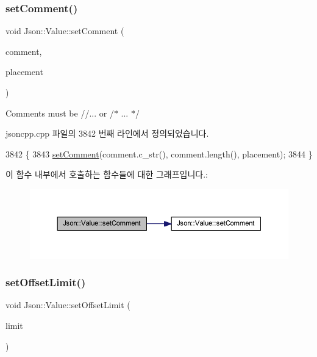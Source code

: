 \subsubsection{\texorpdfstring{set\+Comment()}{setComment()}\hspace{0.1cm}{\footnotesize\ttfamily [3/3]}}
{\footnotesize\ttfamily void Json\+::\+Value\+::set\+Comment (\begin{DoxyParamCaption}\item[{const \hyperlink{json_8h_a1e723f95759de062585bc4a8fd3fa4be}{J\+S\+O\+N\+C\+P\+P\+\_\+\+S\+T\+R\+I\+NG} \&}]{comment,  }\item[{\hyperlink{namespace_json_a4fc417c23905b2ae9e2c47d197a45351}{Comment\+Placement}}]{placement }\end{DoxyParamCaption})}



Comments must be //... or /$\ast$ ... $\ast$/ 



jsoncpp.\+cpp 파일의 3842 번째 라인에서 정의되었습니다.


\begin{DoxyCode}
3842                                                                                 \{
3843   \hyperlink{class_json_1_1_value_a29f3a30f7e5d3af6f38d57999bf5b480}{setComment}(comment.c\_str(), comment.length(), placement);
3844 \}
\end{DoxyCode}
이 함수 내부에서 호출하는 함수들에 대한 그래프입니다.\+:\nopagebreak
\begin{figure}[H]
\begin{center}
\leavevmode
\includegraphics[width=350pt]{class_json_1_1_value_a2c5d13a5f45eb77e912008778e65b27f_cgraph}
\end{center}
\end{figure}
\mbox{\label{class_json_1_1_value_a5e4f5853fec138150c5df6004a8c2bcf}} 
\subsubsection{\texorpdfstring{set\+Offset\+Limit()}{setOffsetLimit()}}
{\footnotesize\ttfamily void Json\+::\+Value\+::set\+Offset\+Limit (\begin{DoxyParamCaption}\item[{ptrdiff\+\_\+t}]{limit }\end{DoxyParamCaption})}



